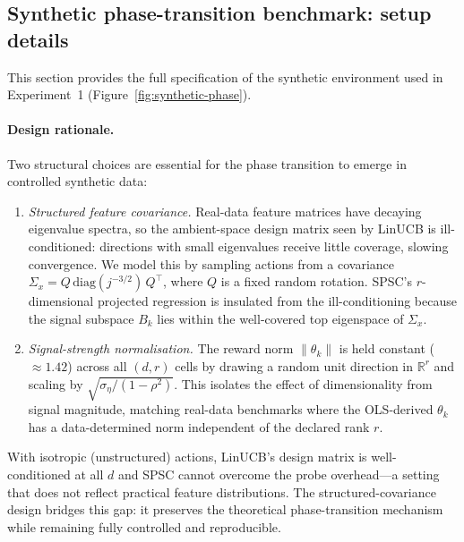 \documentclass{article}
\newcommand{\R}{\mathbb{R}}
\begin{document}
{\subsection{Synthetic phase-transition benchmark: setup details}
\label{app:synthetic_setup}

This section provides the full specification of the synthetic
environment used in Experiment~1
(Figure~\ref{fig:synthetic-phase}).


 \paragraph{Design rationale.}
  Two structural choices are essential for the phase transition to
  emerge in controlled synthetic data:
  \begin{enumerate}[nosep,leftmargin=1.5em]
    \item \emph{Structured feature covariance.}
    Real-data feature matrices have decaying eigenvalue spectra, so
    the ambient-space design matrix seen by LinUCB is ill-conditioned:
    directions with small eigenvalues receive little coverage, slowing
    convergence.
    We model this by sampling actions from a covariance
    $\Sigma_x = Q\,\mathrm{diag}(j^{-3/2})\,Q^\top$, where $Q$ is a
    fixed random rotation.
    SPSC's $r$-dimensional projected regression is insulated from the
    ill-conditioning because the signal subspace $B_k$ lies within the
    well-covered top eigenspace of $\Sigma_x$.

    \item \emph{Signal-strength normalisation.}
    The reward norm $\|\theta_k\|$ is held constant ($\approx 1.42$)
    across all $(d,r)$ cells by drawing a random unit direction in
    $\R^r$ and scaling by $\sqrt{\sigma_\eta/(1-\rho^2)}$.
    This isolates the effect of dimensionality from signal magnitude,
    matching real-data benchmarks where the OLS-derived $\theta_k$ has
    a data-determined norm independent of the declared rank $r$.
  \end{enumerate}
  With isotropic (unstructured) actions, LinUCB's design matrix is
  well-conditioned at all $d$ and SPSC cannot overcome the probe
  overhead---a setting that does not reflect practical feature
  distributions.
  The structured-covariance design bridges this gap: it preserves the
  theoretical phase-transition mechanism while remaining fully
  controlled and reproducible.

}
\end{document}
